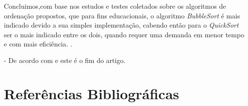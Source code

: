 \documentclass[a4paper,10pt]{article}  %
\begin{document}
    Concluimos,com base nos estudos e testes coletados sobre os algoritmos de ordenação propostos, que para fins educacionais, o algoritmo \textit{BubbleSort} é mais indicado devido a sua simples implementação, cabendo então para o \textit{QuickSort} ser o mais indicado entre os dois, quando requer uma demanda em menor tempo e com mais eficiência.
.

- De acordo com \cite{Benante2008phd} e este é o fim do artigo.


\section*{Referências Bibliográficas}

\nocite{*}


%



\end{document}
